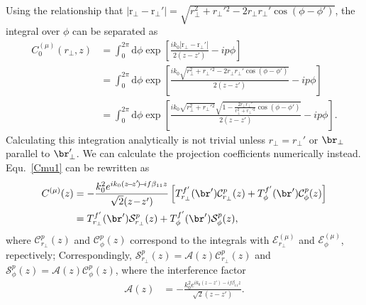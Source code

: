 \documentclass[]{report}
\begin{document}
Using the relationship that $ \left| \mathrm{r}_\perp - \mathrm{r}_\perp'\right|=\sqrt{r_\perp^2+{r_\perp'}\!\!^2 - 2 r_\perp r_\perp'\cos(\phi-\phi')} $, the integral over $ \phi $ can be separated as 
\begin{align}
C^{(\mu)}_0(r_\perp,z) &= \int_0^{2\pi} \!\!\! \mathrm{d}\phi  \exp\!\! \left[ \frac{ik_0 \left| \mathrm{r}_\perp\!\! -\! \mathrm{r}_\perp'\right|}{2(z-z')} \!-\! i p\phi \right]\\
&= \int_0^{2\pi} \!\!\! \mathrm{d}\phi  \exp\!\! \left[ \frac{ik_0 \sqrt{r_\perp^2+{r_\perp'}\!\!^2 - 2 r_\perp r_\perp'\cos(\phi-\phi')} }{2(z-z')} \!-\! i p\phi \right]\\
&= \int_0^{2\pi} \!\!\! \mathrm{d}\phi  \exp\!\! \left[ \frac{ik_0 \sqrt{r_\perp^2 \!+ {r_\perp'}\!\!^2}\sqrt{1 \!-\! \frac{2 r_\perp r_\perp'}{r_\perp^2 \!+ {r_\perp'}\!\!^2}\cos(\phi \!-\! \phi')} }{2(z-z')} \!-\! i p\phi \right].
\end{align}
Calculating this integration analytically is not trivial unless $ r_\perp=r_\perp' $ or $ \br_\perp $ parallel to $ \br_\perp' $. We can calculate the projection coefficients numerically instead. Equ.~\ref{Cmu1} can be rewritten as
\begin{align}
C^{(\mu)} (z) &= - \frac{k_0^2 e^{ik_0(z\!-\!z'\!)\!-\!if\beta_{11} z} }{\sqrt{2}(z\!-\!z')}\left[  T^{f'}_{r_\perp}(\br') \mathcal{C}_{r_\perp}^p (z) +  T^{f'}_\phi(\br') \mathcal{C}_{\phi}^p(z) \right]\\
&= T^{f'}_{r_\perp}(\br') \mathcal{S}_{r_\perp}^p (z) +  T^{f'}_\phi(\br') \mathcal{S}_{\phi}^p(z),
\end{align}
where $ \mathcal{C}_{r_\perp}^p(z) $ and $ \mathcal{C}_\phi^p(z) $ correspond to the integrals with $ \mathcal{E}^{(\mu)}_{r_\perp} $ and $ \mathcal{E}^{(\mu)}_{\phi} $, repectively; Correspondingly, $ \mathcal{S}_{r_\perp}^p(z)=\mathcal{A}(z)\mathcal{C}_{r_\perp}^p(z) $ and $ \mathcal{S}_{\phi}^p(z)=\mathcal{A}(z)\mathcal{C}_\phi^p(z) $, where the interference factor
\begin{align}
\mathcal{A}(z) &= - \frac{k_0^2  e^{ik_0(z\!-\!z'\!)\!-\!if\beta_{11} z}}{\sqrt{2}(z\!-\!z')}.
\end{align} 
\end{document}
